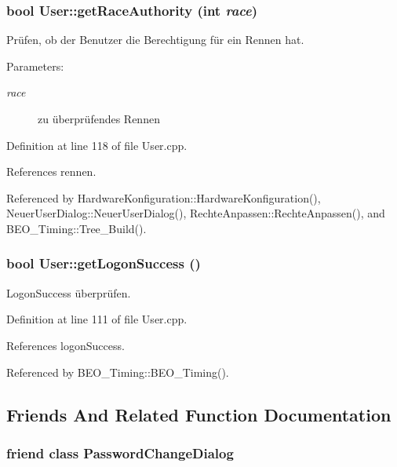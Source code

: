 \hypertarget{class_user_1aa3e9682d94bd9c6c8d6c1e2d90d02a}{
\subsubsection[getRaceAuthority]{\setlength{\rightskip}{0pt plus 5cm}bool User::getRaceAuthority (int {\em race})}}
\label{class_user_1aa3e9682d94bd9c6c8d6c1e2d90d02a}


Prüfen, ob der Benutzer die Berechtigung für ein Rennen hat. 

\begin{Desc}
\item[Parameters:]
\begin{description}
\item[{\em race}]zu überprüfendes Rennen \end{description}
\end{Desc}


Definition at line 118 of file User.cpp.

References rennen.

Referenced by HardwareKonfiguration::HardwareKonfiguration(), NeuerUserDialog::NeuerUserDialog(), RechteAnpassen::RechteAnpassen(), and BEO\_\-Timing::Tree\_\-Build().\hypertarget{class_user_58c0c89c438e6091bb8e056b421efed6}{
\subsubsection[getLogonSuccess]{\setlength{\rightskip}{0pt plus 5cm}bool User::getLogonSuccess ()}}
\label{class_user_58c0c89c438e6091bb8e056b421efed6}


LogonSuccess überprüfen. 



Definition at line 111 of file User.cpp.

References logonSuccess.

Referenced by BEO\_\-Timing::BEO\_\-Timing().

\subsection{Friends And Related Function Documentation}
\hypertarget{class_user_2d41462495b9d75be015c70b749702a6}{
\subsubsection[PasswordChangeDialog]{\setlength{\rightskip}{0pt plus 5cm}friend class {\bf PasswordChangeDialog}}}
\label{class_user_2d41462495b9d75be015c70b749702a6}




